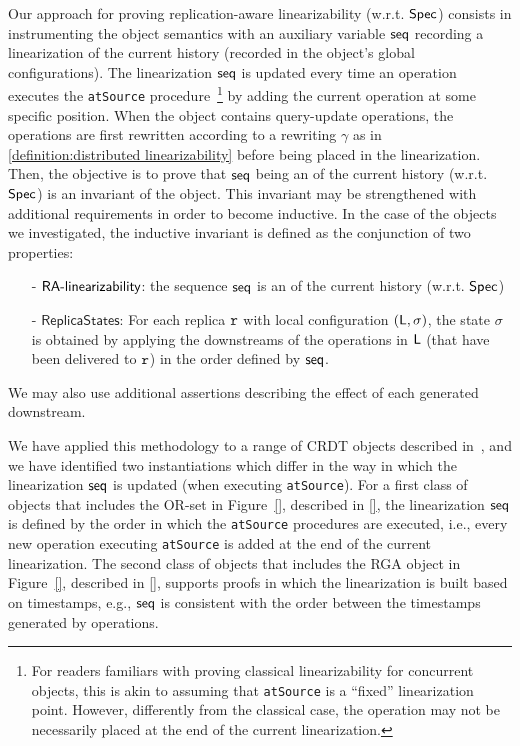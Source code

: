 Our approach for proving replication-aware linearizability (w.r.t. $\mathsf{Spec}{}$) consists in instrumenting the object semantics with an auxiliary variable $\mathsf{seq}$ recording a linearization of the current history (recorded in the object's global configurations). 
The linearization $\mathsf{seq}$ is updated every time an operation executes the {\tt atSource} procedure~\footnote{For readers familiars with proving classical linearizability for concurrent objects, this is akin to assuming that {\tt atSource} is a ``fixed'' linearization point. However, differently from the classical case, the operation may not be necessarily placed at the end of the current linearization.} by adding the current operation at some specific position. When the object contains query-update operations, the operations are first rewritten according to a rewriting $\gamma$ as in \autoref{definition:distributed linearizability} before being placed in the linearization. 
Then, the objective is to prove that $\mathsf{seq}$ being an \crdtlinearization{} of the current history (w.r.t. $\mathsf{Spec}{}$) is an invariant of the object. This invariant may be strengthened with additional requirements in order to become inductive. In the case of the objects we investigated, the inductive invariant is defined as the conjunction of two properties:
\begin{itemize}
\item[-] $\mathsf{RA\text{-}linearizability{}}$: the sequence $\mathsf{seq}$ is an \crdtlinearization{} of the current history (w.r.t. $\mathsf{Spec}{}$) 

\item[-] $\mathsf{ReplicaStates}$: For each replica $\mathtt{r}$ with local configuration $(\mathsf{L},\sigma)$, the state $\sigma$ is obtained by applying the downstreams of the operations in $\mathsf{L}$ (that have been delivered to $\mathtt{r}$) in the order defined by $\mathsf{seq}$.  
\end{itemize}
We may also use additional assertions describing the effect of each generated downstream.

We have applied this methodology to a range of CRDT objects described in~\cite{}, and we have identified two instantiations which differ in the way in which the linearization $\mathsf{seq}$ is updated (when executing {\tt atSource}). For a first class of objects that includes the OR-set in Figure~\ref{}, described in \autoref{}, the linearization $\mathsf{seq}$ is defined by the order in which the {\tt atSource} procedures are executed, i.e., every new operation executing {\tt atSource} is added at the end of the current linearization. 
The second class of objects that includes the RGA object in Figure~\ref{}, described in \autoref{}, supports \CRDTLinshort{} proofs in which the linearization is built based on timestamps, e.g., $\mathsf{seq}$ is consistent with the order between the timestamps generated by operations.


